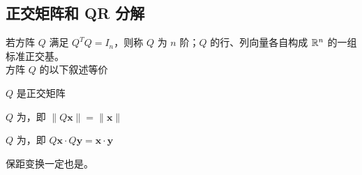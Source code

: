 \documentclass[./main.tex]{subfiles}
\begin{document}
\subsection{正交矩阵和 QR 分解}

若方阵 $Q$ 满足 $Q^TQ=I_n$，则称 $Q$ 为 $n$ 阶；$Q$ 的行、列向量各自构成 $\mathbb{R}^{n}$ 的一组标准正交基。\\

方阵 $Q$ 的以下叙述等价
\begin{enumerate*}
    \item $Q$ 是正交矩阵
    \item $Q$ 为，即 $\|Q\bm{x}\|=\|\bm{x}\|$
    \item $Q$ 为，即 $Q\bm{x}\cdot Q\bm{y}=\bm{x}\cdot\bm{y}$
\end{enumerate*}
保距变换一定也是。
\end{document}
